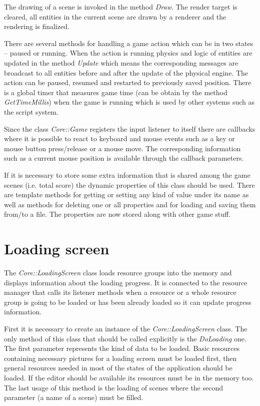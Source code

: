 \documentclass[a4paper, 12pt]{report}
\begin{document}
The drawing of a scene is invoked in the method \emph{Draw}. The render target is cleared, all entities in the current scene are drawn by a renderer and the rendering is finalized.

There are several methods for handling a game action which can be in two states -- paused or running. When the action is running physics and logic of entities are updated in the method \emph{Update} which means the corresponding messages are broadcast to all entities before and after the update of the physical engine. The action can be paused, resumed and restarted to previously saved position. There is a global timer that measures game time (can be obtain by the method \emph{GetTimeMillis}) when the game is running which is used by other systems such as the script system.

Since the class \emph{Core::Game} registers the input listener to itself there are callbacks where it is possible to react to keyboard and mouse events such as a key or mouse button press/release or a mouse move. The corresponding information such as a current mouse position is available through the callback parameters.

If it is necessary to store some extra information that is shared among the game scenes (i.e. total score) the dynamic properties of this class should be used. There are template methods for getting or setting any kind of value under its name as well as methods for deleting one or all properties and for loading and saving them from/to a file. The properties are now stored along with other game stuff.

\section{Loading screen}

The \emph{Core::LoadingScreen} class loads resource groups into the memory and displays information about the loading progress. It is connected to the resource manager that calls its listener methods when a resource or a whole resource group is going to be loaded or has been already loaded so it can update progress information.

First it is necessary to create an instance of the \emph{Core::LoadingScreen} class. The only method of this class that should be called explicitly is the \emph{DoLoading} one. The first parameter represents the kind of data to be loaded. Basic resources containing necessary pictures for a loading screen must be loaded first, then general resources needed in most of the states of the application should be loaded. If the editor should be available its resources must be in the memory too. The last usage of this method is the loading of scenes where the second parameter (a name of a scene) must be filled.
\end{document}
